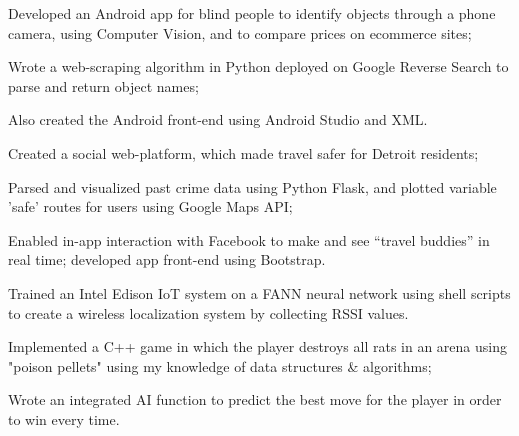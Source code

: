 \documentclass[letterpaper]{deedy-resume-openfont} %
\begin{document}
\begin{minipage}[t]{0.66\textwidth}
\begin{tightemize}
\item Developed an Android app for blind people to identify objects through a phone camera, using Computer Vision, and to compare prices on ecommerce sites; 
\item Wrote a web-scraping algorithm in Python deployed on Google Reverse Search to parse and return object names;
\item Also created the Android front-end using Android Studio and XML.
\end{tightemize}

\sectionsep %

\begin{tightemize}
\item Created a social web-platform, which made travel safer for Detroit residents;
\item Parsed and visualized past crime data using Python Flask, and plotted variable 'safe' routes for users using Google Maps API;
\item Enabled in-app interaction with Facebook to make and see “travel buddies” in real time; developed app front-end using Bootstrap.
\end{tightemize}

\sectionsep %

\begin{tightemize}
\item Trained an Intel Edison IoT system on a FANN neural network using shell scripts to create a wireless localization system by collecting RSSI values.
\end{tightemize}
\sectionsep %

\begin{tightemize}
\item Implemented a C++ game in which the player destroys all rats in an arena using "poison pellets" using my knowledge of data structures \& algorithms;
\item Wrote an integrated AI function to predict the best move for the player in order to win every time.
\end{tightemize}


\end{minipage}
\end{document}
